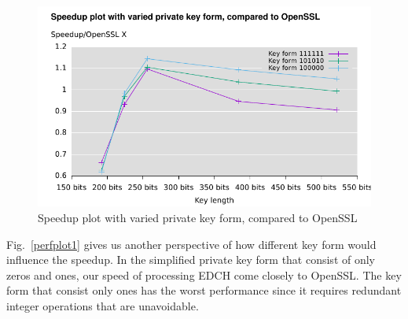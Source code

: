 \begin{figure}\centering
  \includegraphics[scale=0.7]{keysize}
  \caption{Speedup plot with varied private key form, compared to OpenSSL\label{keysize}}
\end{figure}
Fig.~\ref{perfplot1} gives us another perspective of how different key form would influence the speedup. In the simplified private key form that consist of only zeros and ones, our speed of processing EDCH come closely to OpenSSL. The key form that consist only ones has the worst performance since it requires redundant integer operations that are unavoidable. 